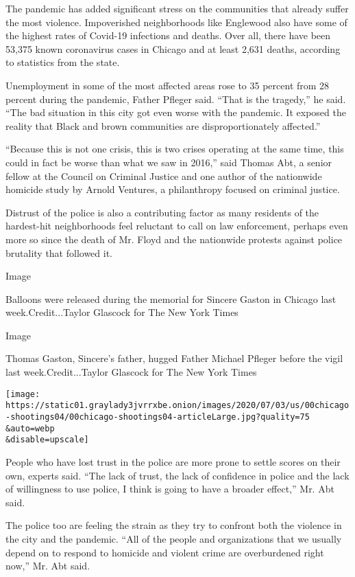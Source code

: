 The pandemic has added significant stress on the communities that
already suffer the most violence. Impoverished neighborhoods like
Englewood also have some of the highest rates of Covid-19 infections and
deaths. Over all, there have been 53,375 known coronavirus cases in
Chicago and at least 2,631 deaths, according to statistics from the
state.

Unemployment in some of the most affected areas rose to 35 percent from
28 percent during the pandemic, Father Pfleger said. ``That is the
tragedy,'' he said. ``The bad situation in this city got even worse with
the pandemic. It exposed the reality that Black and brown communities
are disproportionately affected.''

``Because this is not one crisis, this is two crises operating at the
same time, this could in fact be worse than what we saw in 2016,'' said
Thomas Abt, a senior fellow at the Council on Criminal Justice and one
author of the nationwide homicide study by Arnold Ventures, a
philanthropy focused on criminal justice.

Distrust of the police is also a contributing factor as many residents
of the hardest-hit neighborhoods feel reluctant to call on law
enforcement, perhaps even more so since the death of Mr. Floyd and the
nationwide protests against police brutality that followed it.

Image

Balloons were released during the memorial for Sincere Gaston in Chicago
last week.Credit...Taylor Glascock for The New York Times

Image

Thomas Gaston, Sincere's father, hugged Father Michael Pfleger before
the vigil last week.Credit...Taylor Glascock for The New York Times

\texttt{[image: https://static01.graylady3jvrrxbe.onion/images/2020/07/03/us/00chicago-shootings04/00chicago-shootings04-articleLarge.jpg?quality=75\\\&auto=webp\\\&disable=upscale]}

People who have lost trust in the police are more prone to settle scores
on their own, experts said. ``The lack of trust, the lack of confidence
in police and the lack of willingness to use police, I think is going to
have a broader effect,'' Mr. Abt said.

The police too are feeling the strain as they try to confront both the
violence in the city and the pandemic. ``All of the people and
organizations that we usually depend on to respond to homicide and
violent crime are overburdened right now,'' Mr. Abt said.

